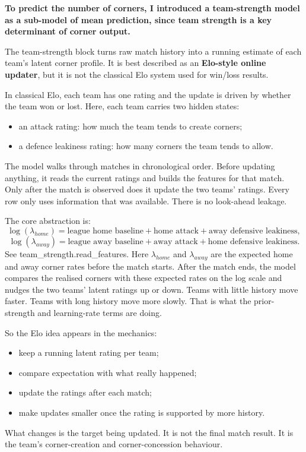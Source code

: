 \documentclass{article}
\begin{document}
\bigskip

\noindent \textbf{To predict the number of corners, I introduced a team-strength model as a sub-model of mean prediction, since team strength is a key determinant of corner output.}

\noindent The team-strength block turns raw match history into a running estimate of each team's latent corner profile. It is best described as an \textbf{Elo-style online updater}, but it is not the classical Elo system used for win/loss results.

In classical Elo, each team has one rating and the update is driven by whether the team won or lost. Here, each team carries two hidden states:
\begin{itemize}
    \item an attack rating: how much the team tends to create corners;
    \item a defence leakiness rating: how many corners the team tends to allow.
\end{itemize}
The model walks through matches in chronological order. Before updating anything, it reads the current ratings and builds the features for that match. Only after the match is observed does it update the two teams' ratings. Every row only uses information that was available. There is no look-ahead leakage.

The core abstraction is:
\[
\log(\lambda_{home})
=
\text{league home baseline}
+
\text{home attack}
+
\text{away defensive leakiness},
\]
\[
\log(\lambda_{away})
=
\text{league away baseline}
+
\text{away attack}
+
\text{home defensive leakiness}.
\]
See team\_strength.read\_features. Here \(\lambda_{home}\) and \(\lambda_{away}\) are the expected home and away corner rates before the match starts. After the match ends, the model compares the realised corners with these expected rates on the log scale and nudges the two teams' latent ratings up or down. Teams with little history move faster. Teams with long history move more slowly. That is what the prior-strength and learning-rate terms are doing.

So the Elo idea appears in the mechanics:
\begin{itemize}
    \item keep a running latent rating per team;
    \item compare expectation with what really happened;
    \item update the ratings after each match;
    \item make updates smaller once the rating is supported by more history.
\end{itemize}
What changes is the target being updated. It is not the final match result. It is the team's corner-creation and corner-concession behaviour.
\end{document}
